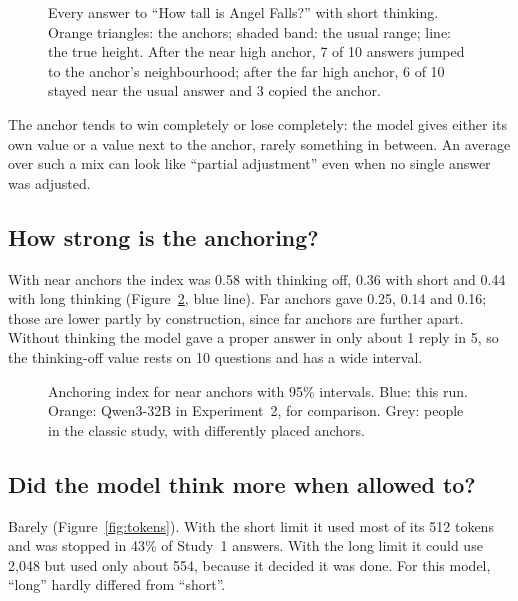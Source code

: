 \documentclass[11pt,a4paper]{article}
\begin{document}
\begin{figure}[ht]
\centering{}
\caption{Every answer to \enquote{How tall is Angel Falls?} with short thinking. Orange triangles: the anchors; shaded band: the usual range; line: the true height. After the near high anchor, 7 of 10 answers jumped to the anchor's neighbourhood; after the far high anchor, 6 of 10 stayed near the usual answer and 3 copied the anchor.}
\label{fig:angel}
\end{figure}

\begin{keybox}
The anchor tends to win completely or lose completely: the model gives either its own value or a value next to the anchor, rarely something in between. An average over such a mix can look like \enquote{partial adjustment} even when no single answer was adjusted.
\end{keybox}

\subsection{How strong is the anchoring?}

With near anchors the index was 0.58 with thinking off, 0.36 with short and 0.44 with long thinking (Figure~\ref{fig:index}, blue line). Far anchors gave 0.25, 0.14 and 0.16; those are lower partly by construction, since far anchors are further apart. Without thinking the model gave a proper answer in only about 1 reply in 5, so the thinking-off value rests on 10 questions and has a wide interval.

\begin{figure}[ht]
\centering{}
\caption{Anchoring index for near anchors with 95\% intervals. Blue: this run. Orange: Qwen3-32B in Experiment~2, for comparison. Grey: people in the classic study, with differently placed anchors.}
\label{fig:index}
\end{figure}

\subsection{Did the model think more when allowed to?}
Barely (Figure~\ref{fig:tokens}). With the short limit it used most of its 512 tokens and was stopped in 43\% of Study~1 answers. With the long limit it could use 2,048 but used only about 554, because it decided it was done. For this model, \enquote{long} hardly differed from \enquote{short}.
\end{document}
